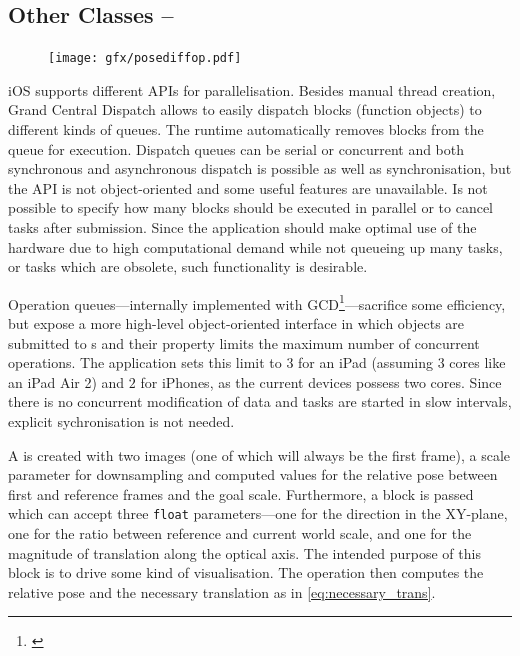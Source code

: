 \FloatBarrier

\subsection{Other Classes -- }

\begin{figure}
   \texttt{[image: gfx/posediffop.pdf]}
\end{figure}
iOS supports different APIs for parallelisation. Besides manual thread creation,
Grand Central Dispatch allows to easily dispatch blocks (function objects) to
different kinds of queues. The runtime automatically removes blocks from the
queue for execution. Dispatch queues can be serial or concurrent and both
synchronous and asynchronous dispatch is possible as well as synchronisation,
but the API is not object-oriented and some useful features are unavailable.  Is
not possible to specify how many blocks should be executed in parallel or to
cancel tasks after submission. Since the application should make optimal use of
the hardware due to high computational demand while not queueing up many tasks,
or tasks which are obsolete, such functionality is desirable.

Operation queues---internally implemented with
GCD\footnote{\citep{nsopgcd}}---sacrifice some efficiency, but expose a more
high-level object-oriented interface in which  objects are
submitted to s and their
 property limits the maximum number of
concurrent operations. The application sets this limit to $3$ for an iPad
(assuming $3$ cores like an iPad Air 2) and $2$ for iPhones, as the current
devices possess two cores. Since there is no concurrent modification of data and
tasks are started in slow intervals, explicit sychronisation is not needed.

A  is created with two images (one of
which will always be the first frame), a scale parameter for downsampling and
computed values for the relative pose between first and reference frames and the
goal scale. Furthermore, a block is passed which can accept three \texttt{float}
parameters---one for the direction in the XY-plane, one for the ratio between
reference and current world scale, and one for the magnitude of translation along
the optical axis. The intended purpose of this block is to drive some kind of
visualisation. The operation then computes the relative pose and the necessary
translation as in \eqref{eq:necessary_trans}. 

